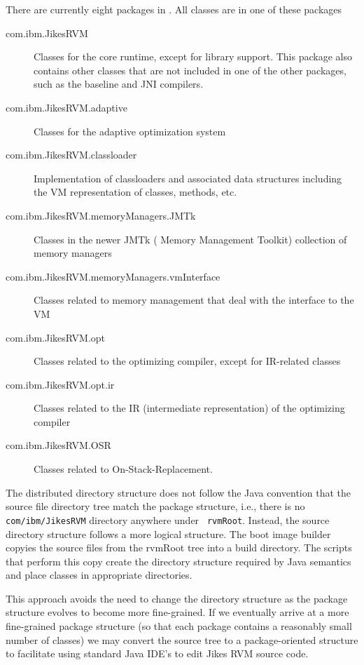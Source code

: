 There are currently eight packages in \jrvm. All classes are in
one of these packages
\begin{description}
\item[com.ibm.JikesRVM] Classes for the core runtime, except for library
support.  This package also contains other classes that are not
included in one of the other packages, such as the baseline and JNI
compilers. 

\item[com.ibm.JikesRVM.adaptive] Classes for the adaptive optimization system

\item[com.ibm.JikesRVM.classloader] Implementation of classloaders
and associated data structures including the VM representation of classes,
methods, etc. 

\item[com.ibm.JikesRVM.memoryManagers.JMTk] Classes in the newer JMTk
(\JavaTM{} Memory Management Toolkit) collection of memory managers

\item[com.ibm.JikesRVM.memoryManagers.vmInterface] Classes related to
memory management that deal with the interface to the VM

\item[com.ibm.JikesRVM.opt] Classes related to the optimizing
compiler, except for IR-related classes

\item[com.ibm.JikesRVM.opt.ir] Classes related to the IR
(intermediate representation) of the optimizing compiler

\item[com.ibm.JikesRVM.OSR] Classes related to On-Stack-Replacement. 

\end{description}

The distributed directory structure
does not follow the Java convention that the source file directory tree
match the package structure, i.e.,
there is no {\tt com/ibm/JikesRVM} directory anywhere under {\tt
rvmRoot}.  Instead, the source directory structure follows a more logical 
structure.  The boot image builder
copyies the source files from the rvmRoot tree into a build
directory.  The scripts that perform this copy create the directory
structure required by Java semantics and place classes in appropriate
directories.

This approach avoids the need to change the directory structure as the
package structure evolves to become more fine-grained. If we
eventually arrive at a more fine-grained package structure (so that
each package contains a reasonably small number of classes) we may
convert the source tree to a package-oriented structure to facilitate
using standard Java IDE's to edit Jikes RVM source code.
